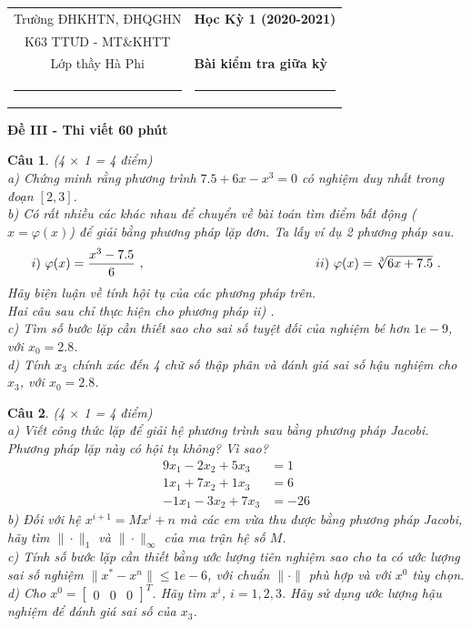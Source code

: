 \documentclass[11pt]{article}
\newtheorem{bt}{Câu}
\newcommand{\m}[1]{
	\begin{bmatrix}
		#1
	\end{bmatrix}
}
\begin{document}
\begin{tabular*}
{\linewidth}{c>{\centering\hspace{0pt}} p{}}
Trường ĐHKHTN, ĐHQGHN & {\bf Học Kỳ 1 (2020-2021)}
\tabularnewline
K63 TTƯD - MT\&KHTT \\ Lớp thầy Hà Phi & {\bf Bài kiểm tra giữa kỳ}
\tabularnewline
\rule{1in}{1pt}  \small  & \rule{2in}{1pt} %
\tabularnewline

\end{tabular*}
%

\begin{center}	
\textbf{Đề III - Thi viết 60 phút}
\end{center}

\begin{bt}(4 $\times$ 1 = 4 điểm) \\
a)	Chứng minh rằng phương trình $7.5 + 6 x - x^3=0$ có nghiệm duy nhất trong đoạn $[2,3]$. \\
b)	Có rất nhiều các khác nhau để chuyển về bài toán tìm điểm bất động ($x=\varphi(x)$) để giải bằng phương pháp lặp đơn. Ta lấy ví dụ 2 phương pháp sau.
%
\[
i) \ \varphi(x) = \dfrac{x^3-7.5}{6} \ , \hskip 4cm \qquad  ii) \ \varphi(x) = \sqrt[3]{6x+7.5} \ .
\]
%
Hãy biện luận về tính hội tụ của các phương pháp trên. \\
Hai câu sau chỉ thực hiện cho phương pháp ii) . \\
c) Tìm số bước lặp cần thiết sao cho sai số tuyệt đối của nghiệm bé hơn $1e-9$, với $x_0 = 2.8$. \\
d) Tính $x_3$ chính xác đến 4 chữ số thập phân và đánh giá sai số hậu nghiệm cho $x_3$, với $x_0 = 2.8$. 
\end{bt}


\begin{bt}(4 $\times$ 1 = 4 điểm) \\
	a) Viết công thức lặp để giải hệ phương trình sau bằng phương pháp Jacobi. Phương pháp lặp này có hội tụ không? Vì sao?
	\begin{align*}
	9 x_1 - 2 x_2 + 5 x_3 &= 1 \\
	1 x_1 + 7 x_2 + 1  x_3 &= 6 \\
	-1 x_1 - 3  x_2 + 7 x_3 &= -26 
	\end{align*}
	b) Đối với hệ $x^{i+1} = M x^{i} + n$ mà các em vừa thu được bằng phương pháp Jacobi, hãy tìm $\|\cdot\|_1$ và $\|\cdot\|_{\infty}$ của ma trận hệ số $M$. \\
	c) Tính số bước lặp cần thiết bằng ước lượng tiên nghiệm sao cho ta có ước lượng sai số nghiệm $\|x^*-x^n\| \leq 1e-6$, với chuẩn $\|\cdot\|$ phù hợp và với $x^0$ tùy chọn. \\
	d) Cho $x^0 = \m{0 & 0 & 0}^T$. Hãy tìm $x^i$, $i=1,2,3$. Hãy sử dụng ước lượng hậu nghiệm để đánh giá sai số của $x_3$.
\end{bt}
\end{document}
